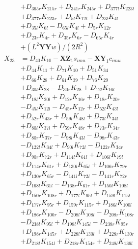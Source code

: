 \begin{multicols}{2}
\begin{align}
&+ D_{365r}K_{215r} + D_{341r}K_{245r} + D_{377l}K_{223l}  \nonumber \\
&+ D_{377r}K_{223r} + D_{5l}K_{12l} + D_{23l}K_{4l}  \nonumber \\
&+ D_{35l}K_{6l} - D_{65l}K_{4l} + D_{5r}K_{12r}  \nonumber \\
&+ D_{23r}K_{4r} + D_{35r}K_{6r} - D_{65r}K_{4r}  \nonumber \\
&+ (L^2\mathbf{YY}w)/(2R^2) \nonumber \\
X_{23} &= D_{40}K_{10} - \mathbf{XZ}_1s_{imu} - \mathbf{XY}_1c_{imu}  \nonumber \\
&+ D_{44}K_{11} + D_{71}K_{10} + D_{51}K_{34}  \nonumber \\
&+ D_{66}K_{28} + D_{61}K_{39} + D_{76}K_{29}  \nonumber \\
&+ D_{30l}K_{28} - D_{30r}K_{28} + D_{12l}K_{16l}  \nonumber \\
&+ D_{18l}K_{20l} + D_{12r}K_{16r} + D_{18r}K_{20r}  \nonumber \\
&- D_{45l}K_{12l} - D_{45r}K_{12r} + D_{52l}K_{43l}  \nonumber \\
&+ D_{52r}K_{43r} + D_{59l}K_{48l} + D_{73l}K_{34l}  \nonumber \\
&+ D_{80l}K_{37l} + D_{59r}K_{48r} + D_{73r}K_{34r}  \nonumber \\
&+ D_{80r}K_{37r} - D_{98l}K_{43l} - D_{98r}K_{43r}  \nonumber \\
&- D_{122l}K_{34l} + D_{90l}K_{72l} - D_{122r}K_{34r}  \nonumber \\
&+ D_{90r}K_{72r} + D_{114l}K_{61l} + D_{106l}K_{79l}  \nonumber \\
&+ D_{114r}K_{61r} + D_{130l}K_{65l} + D_{106r}K_{79r}  \nonumber \\
&+ D_{130r}K_{65r} - D_{141l}K_{72l} - D_{141r}K_{72r}  \nonumber \\
&- D_{168l}K_{61l} - D_{168r}K_{61r} + D_{150l}K_{108l}  \nonumber \\
&+ D_{150r}K_{108r} + D_{177l}K_{95l} + D_{159l}K_{115l}  \nonumber \\
&+ D_{177r}K_{95r} + D_{159r}K_{115r} + D_{186l}K_{100l}  \nonumber \\
&+ D_{186r}K_{100r} - D_{208l}K_{108l} - D_{208r}K_{108r}  \nonumber \\
&- D_{238l}K_{95l} + D_{198l}K_{145l} - D_{238r}K_{95r}  \nonumber \\
&+ D_{198r}K_{145r} + D_{228l}K_{130l} + D_{228r}K_{130r}  \nonumber \\
&+ D_{218l}K_{154l} + D_{218r}K_{154r} + D_{248l}K_{136l}  \nonumber \\

\end{align}
\end{multicols}
